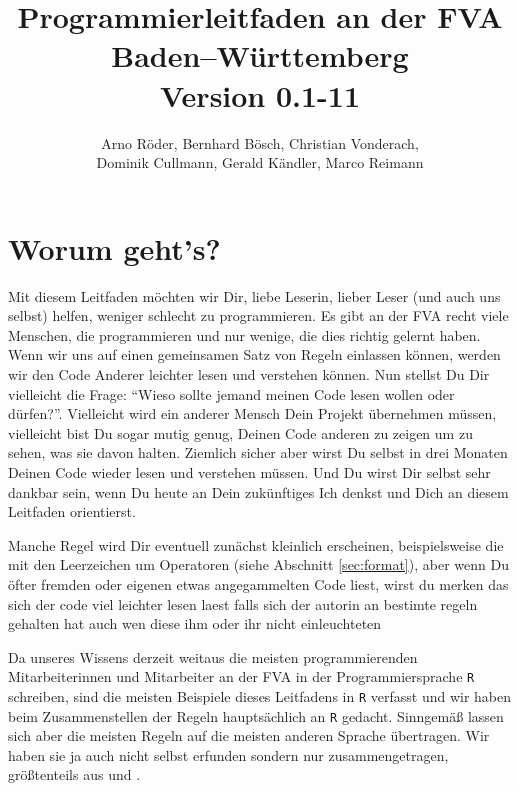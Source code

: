 \documentclass[twoside]{scrartcl}
\providecommand{\R}{\texttt{R}}
\begin{document}
\title{Programmierleitfaden an der FVA Baden--W\"u{}rttemberg\\
\vspace{1cm}
\normalsize{Version 0.1-11}}
\author{Arno R\"oder, Bernhard B\"o{}sch, Christian Vonderach,\\
Dominik Cullmann, Gerald K\"a{}ndler, Marco Reimann}
\maketitle
\tableofcontents
\thispagestyle{fancy}
\section{Worum geht's?}
Mit diesem Leitfaden m\"o{}chten wir Dir, liebe Leserin, lieber Leser (und auch
uns selbst) helfen, weniger schlecht zu programmieren.
Es gibt an der FVA recht viele Menschen, die programmieren und nur wenige, die
dies richtig gelernt haben. Wenn wir uns auf einen gemeinsamen Satz von Regeln
einlassen k\"o{}nnen, werden wir den Code Anderer leichter lesen und verstehen
k\"o{}nnen.
Nun stellst Du Dir vielleicht die Frage: "`Wieso sollte jemand meinen Code lesen
wollen oder d\"u{}rfen?"'. Vielleicht wird ein anderer Mensch Dein Projekt
\"u{}bernehmen m\"u{}ssen, vielleicht bist Du sogar mutig genug, Deinen Code
anderen zu zeigen um zu sehen, was sie davon halten. Ziemlich sicher aber wirst
Du selbst in drei Monaten Deinen Code wieder lesen und verstehen m\"u{}ssen. Und
Du wirst Dir selbst sehr dankbar sein, wenn Du heute an Dein zuk\"u{}nftiges
Ich denkst und Dich an diesem Leitfaden orientierst.

Manche Regel wird Dir eventuell zun\"a{}chst kleinlich erscheinen,
beispielsweise die mit den Leerzeichen  um  Operatoren (siehe Abschnitt
\ref{sec:format}), aber wenn Du \"o{}fter fremden oder eigenen etwas
angegammelten Code liest, wirst
du merken das sich der code viel leichter lesen laest falls sich der autorin  an
bestimte regeln gehalten hat auch wen diese ihm oder ihr nicht einleuchteten

Da unseres Wissens derzeit weitaus die meisten programmierenden Mitarbeiterinnen
und Mitarbeiter an der FVA in der Programmiersprache \R{} schreiben, sind die
meisten Beispiele dieses Leitfadens in \R{} verfasst und wir haben beim
Zusammenstellen der Regeln haupts\"a{}chlich an \R{} gedacht.
Sinngem\"a{}\ss{} lassen sich aber die meisten Regeln auf die meisten
anderen Sprache \"u{}bertragen. Wir haben sie ja auch nicht selbst erfunden
sondern nur zusammengetragen, gr\"o{}\ss{}tenteils aus \cite{cc} und \cite{wsp}.
\end{document}
